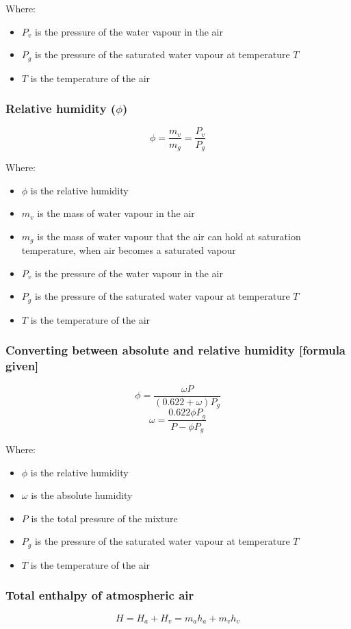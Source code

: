 \documentclass[11pt]{article}
\begin{document}
Where:
\begin{itemize}
\item \(P_v\) is the pressure of the water vapour in the air
\item \(P_g\) is the pressure of the saturated water vapour at temperature \(T\)
\item \(T\) is the temperature of the air
\end{itemize}
\subsubsection{Relative humidity (\(\phi\))}
\label{sec:orgdfc338b}
\[\phi = \frac{m_v}{m_g} = \frac{P_v}{P_g}\]

Where:
\begin{itemize}
\item \(\phi\) is the relative humidity
\item \(m_v\) is the mass of water vapour in the air
\item \(m_g\) is the mass of water vapour that the air can hold at saturation temperature, when air becomes a saturated vapour
\item \(P_v\) is the pressure of the water vapour in the air
\item \(P_g\) is the pressure of the saturated water vapour at temperature \(T\)
\item \(T\) is the temperature of the air
\end{itemize}
\subsubsection{Converting between absolute and relative humidity [formula given]}
\label{sec:org6b76ff1}
\[\phi = \frac{\omega P}{(0.622 + \omega) P_g}\]
\[\omega = \frac{0.622 \phi P_g}{P - \phi P_g}\]

Where:
\begin{itemize}
\item \(\phi\) is the relative humidity
\item \(\omega\) is the absolute humidity
\item \(P\) is the total pressure of the mixture
\item \(P_g\) is the pressure of the saturated water vapour at temperature \(T\)
\item \(T\) is the temperature of the air
\end{itemize}
\subsubsection{Total enthalpy of atmospheric air}
\label{sec:orgc2283eb}
\[H = H_a + H_v = m_a h_a + m_v h_v\]
\end{document}
